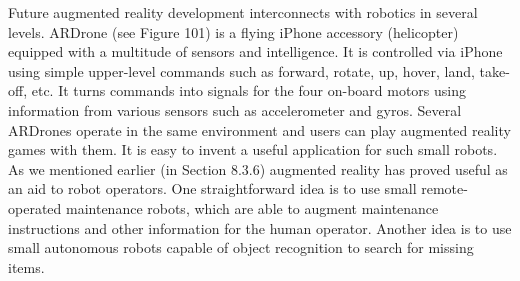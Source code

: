 Future augmented reality development interconnects with robotics in several levels. ARDrone (see Figure 101) is a flying iPhone accessory (helicopter) equipped with a multitude of sensors and intelligence. It is controlled via iPhone using simple upper-level commands such as forward, rotate, up, hover, land, take-off, etc. It turns commands into signals for the four on-board motors using information from various sensors such as accelerometer and gyros. Several ARDrones operate in the same environment and users can play augmented reality games with them. It is easy to invent a useful application for such small robots. As we mentioned earlier (in Section 8.3.6) augmented reality has proved useful as an aid to robot operators. One straightforward idea is to use small remote-operated maintenance robots, which are able to augment maintenance instructions and other information for the human operator. Another idea is to use small autonomous robots capable of object recognition to search for missing items.

